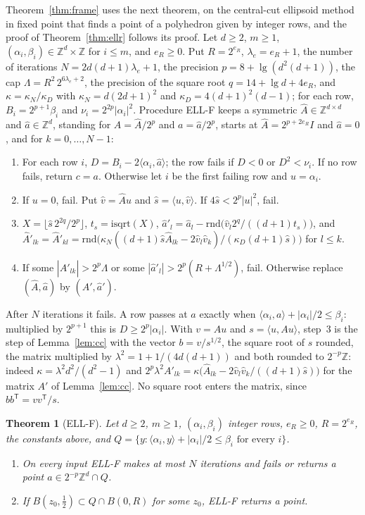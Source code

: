 \documentclass[11pt]{amsart}
\newtheorem{theorem}{Theorem}[section]
\theoremstyle{definition}
\numberwithin{equation}{section}
\newcommand{\ip}[1]{\langle #1\rangle}
\begin{document}
Theorem~\ref{thm:frame} uses the next theorem, on the central-cut ellipsoid method in fixed point that finds a point of a polyhedron given by integer rows, and the proof of Theorem~\ref{thm:ellr} follows its proof. Let $d\ge2$, $m\ge1$, $(\alpha_i,\beta_i)\in\mathbb Z^d\times\mathbb Z$ for $i\le m$, and $e_R\ge0$. Put $R=2^{e_R}$, $\lambda_e=e_R+1$, the number of iterations $N=2d(d+1)\lambda_e+1$, the precision $p=8+\lg(d^2(d+1))$, the cap $\Lambda=R^2\,2^{6\lambda_e+2}$, the precision of the square root $q=14+\lg d+4e_R$, and $\kappa=\kappa_N/\kappa_D$ with $\kappa_N=d(2d+1)^2$ and $\kappa_D=4(d+1)^2(d-1)$; for each row, $B_i=2^{p+1}\beta_i$ and $\nu_i=2^{2p}|\alpha_i|^2$. Procedure ELL-F keeps a symmetric $\hat A\in\mathbb Z^{d\times d}$ and $\hat a\in\mathbb Z^d$, standing for $A=\hat A/2^p$ and $a=\hat a/2^p$, starts at $\hat A=2^{p+2e_R}I$ and $\hat a=0$, and for $k=0,\dots,N-1$:
\begin{enumerate}[label=\arabic*.,leftmargin=2em]
\item For each row $i$, $D=B_i-2\ip{\alpha_i,\hat a}$; the row fails if $D<0$ or $D^2<\nu_i$. If no row fails, return $c=a$. Otherwise let $i$ be the first failing row and $u=\alpha_i$.
\item If $u=0$, fail. Put $\hat v=\hat Au$ and $\hat s=\ip{u,\hat v}$. If $4\hat s<2^p|u|^2$, fail.
\item $X=\lfloor\hat s\,2^{2q}/2^p\rfloor$, $t_s=\mathrm{isqrt}(X)$, $\hat a'_l=\hat a_l-\mathrm{rnd}\bigl(\hat v_l2^q/((d+1)t_s)\bigr)$, and $\hat A'_{lk}=\hat A'_{kl}=\mathrm{rnd}\bigl(\kappa_N((d+1)\hat s\hat A_{lk}-2\hat v_l\hat v_k)/(\kappa_D(d+1)\hat s)\bigr)$ for $l\le k$.
\item If some $|\hat A'_{lk}|>2^p\Lambda$ or some $|\hat a'_l|>2^p(R+\Lambda^{1/2})$, fail. Otherwise replace $(\hat A,\hat a)$ by $(\hat A',\hat a')$.
\end{enumerate}
After $N$ iterations it fails. A row passes at $a$ exactly when $\ip{\alpha_i,a}+|\alpha_i|/2\le\beta_i$: multiplied by $2^{p+1}$ this is $D\ge2^p|\alpha_i|$. With $v=Au$ and $s=\ip{u,Au}$, step~3 is the step of Lemma~\ref{lem:cc} with the vector $b=v/s^{1/2}$, the square root of $s$ rounded, the matrix multiplied by $\lambda^2=1+1/(4d(d+1))$ and both rounded to $2^{-p}\mathbb Z$: indeed $\kappa=\lambda^2d^2/(d^2-1)$ and $2^p\lambda^2A'_{lk}=\kappa\bigl(\hat A_{lk}-2\hat v_l\hat v_k/((d+1)\hat s)\bigr)$ for the matrix $A'$ of Lemma~\ref{lem:cc}. No square root enters the matrix, since $bb^{\mathsf T}=vv^{\mathsf T}/s$.

\begin{theorem}[ELL-F]\label{thm:ellf}
Let $d\ge2$, $m\ge1$, $(\alpha_i,\beta_i)$ integer rows, $e_R\ge0$, $R=2^{e_R}$, the constants above, and $Q=\{y:\ip{\alpha_i,y}+|\alpha_i|/2\le\beta_i\text{ for every }i\}$.
\begin{enumerate}[label=(\alph*)]
\item On every input ELL-F makes at most $N$ iterations and fails or returns a point $a\in2^{-p}\mathbb Z^d\cap Q$.
\item If $B(z_0,\frac12)\subset Q\cap B(0,R)$ for some $z_0$, ELL-F returns a point.
\end{enumerate}
\end{theorem}
\end{document}

